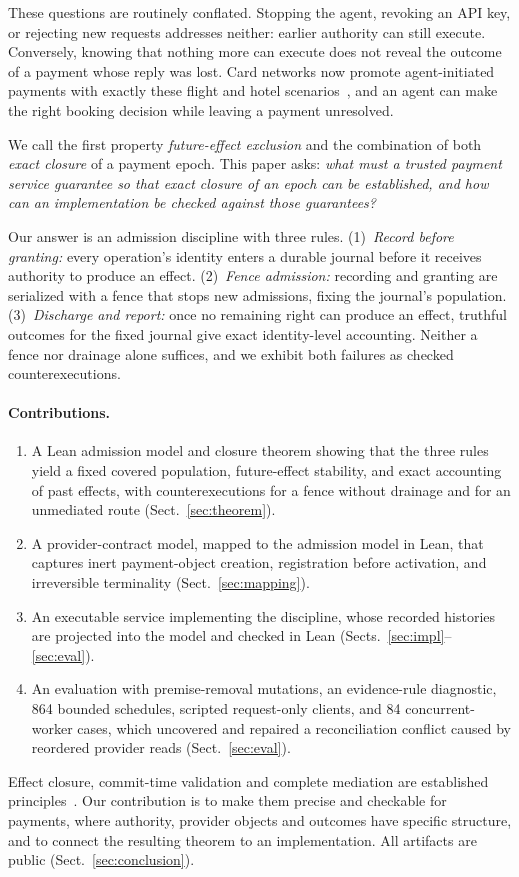\documentclass[runningheads]{llncs}
\begin{document}
These questions are routinely conflated. Stopping the agent, revoking an API
key, or rejecting new requests addresses neither: earlier authority can still
execute. Conversely, knowing that nothing more can execute does not reveal the
outcome of a payment whose reply was lost. Card networks now promote
agent-initiated payments with exactly these flight and hotel
scenarios~\cite{mastercard2026,visa2026}, and an agent can make the right
booking decision while leaving a payment unresolved.

We call the first property \emph{future-effect exclusion} and the combination
of both \emph{exact closure} of a payment epoch. This paper asks: \emph{what
must a trusted payment service guarantee so that exact closure of an epoch can
be established, and how can an implementation be checked against those
guarantees?}

Our answer is an admission discipline with three rules. (1)~\emph{Record before
granting:} every operation's identity enters a durable journal before it
receives authority to produce an effect. (2)~\emph{Fence admission:} recording
and granting are serialized with a fence that stops new admissions, fixing the
journal's population. (3)~\emph{Discharge and report:} once no remaining right
can produce an effect, truthful outcomes for the fixed journal give exact
identity-level accounting. Neither a fence nor drainage alone suffices, and we
exhibit both failures as checked counterexecutions.

\paragraph{Contributions.}
\begin{enumerate}
\item A Lean admission model and closure theorem showing that the three rules
yield a fixed covered population, future-effect stability, and exact accounting
of past effects, with counterexecutions for a fence without drainage and for
an unmediated route (Sect.~\ref{sec:theorem}).
\item A provider-contract model, mapped to the admission model in Lean, that
captures inert payment-object creation, registration before activation, and
irreversible terminality (Sect.~\ref{sec:mapping}).
\item An executable service implementing the discipline, whose recorded
histories are projected into the model and checked in Lean
(Sects.~\ref{sec:impl}--\ref{sec:eval}).
\item An evaluation with premise-removal mutations, an evidence-rule
diagnostic, 864 bounded schedules, scripted request-only clients, and 84
concurrent-worker cases, which uncovered and repaired a reconciliation conflict
caused by reordered provider reads (Sect.~\ref{sec:eval}).
\end{enumerate}
Effect closure, commit-time validation and complete mediation are established
principles~\cite{effectbound,cta,salas,saltzer1975}. Our contribution is to make
them precise and checkable for payments, where authority, provider objects and
outcomes have specific structure, and to connect the resulting theorem to an
implementation. All artifacts are public (Sect.~\ref{sec:conclusion}).
\end{document}
